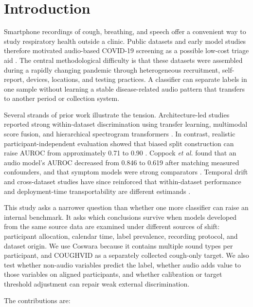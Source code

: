 \section{Introduction}

Smartphone recordings of cough, breathing, and speech offer a convenient way
to study respiratory health outside a clinic. Public datasets and early model
studies therefore motivated audio-based COVID-19 screening as a possible
low-cost triage aid \cite{xia2021covid,bhattacharya2023coswara,orlandic2021coughvid}.
The central methodological difficulty is that these datasets were assembled
during a rapidly changing pandemic through heterogeneous recruitment,
self-report, devices, locations, and testing practices. A classifier can
separate labels in one sample without learning a stable disease-related audio
pattern that transfers to another period or collection system.

Several strands of prior work illustrate the tension. Architecture-led studies
reported strong within-dataset discrimination using transfer learning,
multimodal score fusion, and hierarchical spectrogram transformers
\cite{pahar2022transfer,chetupalli2023multimodal,aytekin2024hst}. In contrast, realistic
participant-independent evaluation showed that biased split construction can
raise AUROC from approximately 0.71 to 0.90 \cite{han2022realistic}. Coppock
\emph{et al.} found that an audio model's AUROC decreased from 0.846 to 0.619
after matching measured confounders, and that symptom models were strong
comparators \cite{coppock2024audio}. Temporal drift and cross-dataset studies
have since reinforced that within-dataset performance and deployment-time
transportability are different estimands \cite{ganitidis2025drift,islam2026robust}.

This study asks a narrower question than whether one more classifier can raise
an internal benchmark. It asks which conclusions survive when models developed
from the same source data are examined under different sources of shift:
participant allocation, calendar time, label prevalence, recording protocol,
and dataset origin. We use Coswara because it contains multiple sound types per
participant, and COUGHVID as a separately collected cough-only target. We also
test whether non-audio variables predict the label, whether audio adds value to
those variables on aligned participants, and whether calibration or target
threshold adjustment can repair weak external discrimination.

The contributions are:

